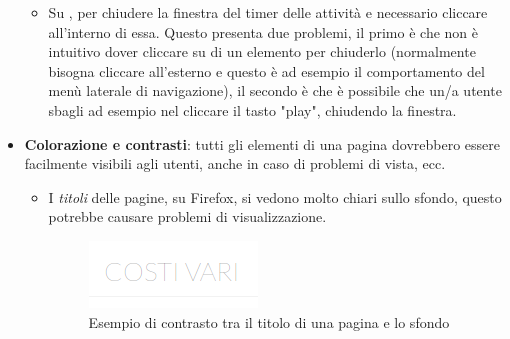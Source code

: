 \begin{itemize}
\begin{itemize}
	\item Su \textit{\resa{}}, per chiudere la finestra del timer delle attività e necessario cliccare
	all'interno di essa. Questo presenta due problemi, il primo è che non è intuitivo dover
	cliccare su di un elemento per chiuderlo (normalmente bisogna cliccare all'esterno e questo
	è ad esempio il comportamento del menù laterale di navigazione), il secondo è che è
	possibile che un/a utente sbagli ad esempio nel cliccare il tasto "play", chiudendo la
	finestra.
	\end{itemize}
\item \textbf{Colorazione e contrasti}: tutti gli elementi di una pagina dovrebbero
essere facilmente visibili agli utenti, anche in caso di problemi di vista, ecc.
	\begin{itemize}
	\item I \textit{titoli} delle pagine, su Firefox, si vedono molto chiari sullo sfondo,
	questo potrebbe causare problemi di visualizzazione.
	
	\begin{figure}[H]\label{imgContrasti}
	\centering
	\includegraphics[width=.4\columnwidth]{images/contrasti.png}
	\caption{Esempio di contrasto tra il titolo di una pagina e lo sfondo}
	\end{figure}
	

\end{itemize}
\end{itemize}
